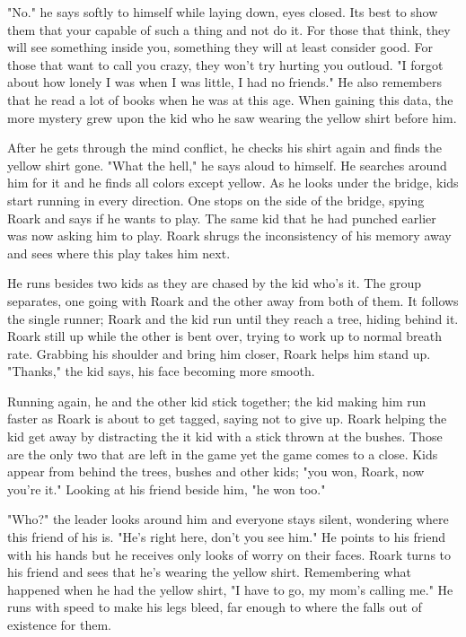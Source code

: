         "No." he says softly to himself while laying down, eyes closed. Its best to show them that your capable of such a thing and not do it.
    For those that think, they will see something inside you, something they will at least consider good. For those that want to call you crazy,
    they won't try hurting you outloud. "I forgot about how lonely I was when I was little, I had no friends." He also remembers that he read
    a lot of books when he was at this age. When gaining this data, the more mystery grew upon the kid who he saw wearing the yellow shirt before
    him. 

        After he gets through the mind conflict, he checks his shirt again and finds the yellow shirt gone. "What the hell," he says aloud to
    himself. He searches around him for it and he finds all colors except yellow. As he looks under the bridge, kids start running in every
    direction. One stops on the side of the bridge, spying Roark and says if he wants to play. The same kid that he had punched earlier was
    now asking him to play. Roark shrugs the inconsistency of his memory away and sees where this play takes him next.

        He runs besides two kids as they are chased by the kid who's it. The group separates, one going with Roark and the other away from both
    of them. It follows the single runner; Roark and the kid run until they reach a tree, hiding behind it. Roark still up while the other is
    bent over, trying to work up to normal breath rate. Grabbing his shoulder and bring him closer, Roark helps him stand up. "Thanks," the kid
    says, his face becoming more smooth.

        Running again, he and the other kid stick together; the kid making him run faster as Roark is about to get tagged, saying not to give up.
    Roark helping the kid get away by distracting the it kid with a stick thrown at the bushes. Those are the only two that are left in the game
    yet the game comes to a close. Kids appear from behind the trees, bushes and other kids; "you won, Roark, now you're it." Looking at his 
    friend beside him, "he won too."

        "Who?" the leader looks around him and everyone stays silent, wondering where this friend of his is. "He's right here, don't you see 
    him." He points to his friend with his hands but he receives only looks of worry on their faces. Roark turns to his friend and sees that
    he's wearing the yellow shirt. Remembering what happened when he had the yellow shirt, "I have to go, my mom's calling me." He runs with
    speed to make his legs bleed, far enough to where the falls out of existence for them.

